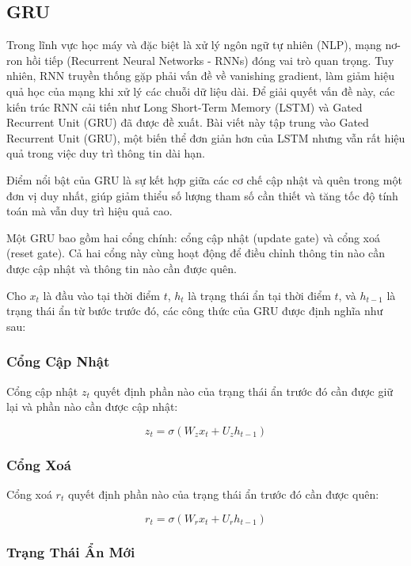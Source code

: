 \subsection{GRU}

Trong lĩnh vực học máy và đặc biệt là xử lý ngôn ngữ tự nhiên (NLP), mạng nơ-ron hồi tiếp (Recurrent Neural Networks - RNNs) đóng vai trò quan trọng. Tuy nhiên, RNN truyền thống gặp phải vấn đề về vanishing gradient, làm giảm hiệu quả học của mạng khi xử lý các chuỗi dữ liệu dài. Để giải quyết vấn đề này, các kiến trúc RNN cải tiến như Long Short-Term Memory (LSTM) và Gated Recurrent Unit (GRU) đã được đề xuất. Bài viết này tập trung vào Gated Recurrent Unit (GRU), một biến thể đơn giản hơn của LSTM nhưng vẫn rất hiệu quả trong việc duy trì thông tin dài hạn.

Điểm nổi bật của GRU là sự kết hợp giữa các cơ chế cập nhật và quên trong một đơn vị duy nhất, giúp giảm thiểu số lượng tham số cần thiết và tăng tốc độ tính toán mà vẫn duy trì hiệu quả cao.

Một GRU bao gồm hai cổng chính: cổng cập nhật (update gate) và cổng xoá (reset gate). Cả hai cổng này cùng hoạt động để điều chỉnh thông tin nào cần được cập nhật và thông tin nào cần được quên. 

Cho \( x_t \) là đầu vào tại thời điểm \( t \), \( h_t \) là trạng thái ẩn tại thời điểm \( t \), và \( h_{t-1} \) là trạng thái ẩn từ bước trước đó, các công thức của GRU được định nghĩa như sau:

\subsubsection{Cổng Cập Nhật}

Cổng cập nhật \( z_t \) quyết định phần nào của trạng thái ẩn trước đó cần được giữ lại và phần nào cần được cập nhật:

\[
z_t = \sigma(W_z x_t + U_z h_{t-1})
\]

\subsubsection{Cổng Xoá}

Cổng xoá \( r_t \) quyết định phần nào của trạng thái ẩn trước đó cần được quên:

\[
r_t = \sigma(W_r x_t + U_r h_{t-1})
\]

\subsubsection{Trạng Thái Ẩn Mới}

